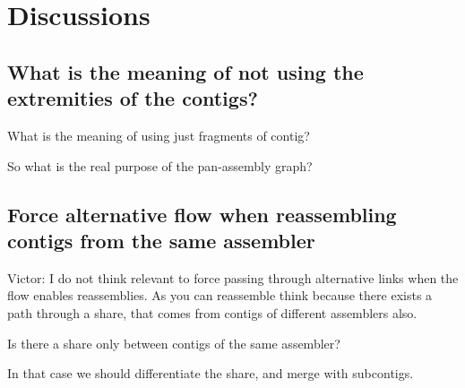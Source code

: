 \section{Discussions}

\subsection{What is the meaning of not using the extremities of the contigs?}

What is the meaning of using just fragments of contig?

So what is the real purpose of the pan-assembly graph?

\subsection{Force alternative flow when reassembling contigs from the same assembler}

Victor: I do not think relevant to force passing through alternative links when the flow enables reassemblies.
As you can reassemble think because there exists a path through a share, that comes from contigs of different assemblers also.

\begin{missingproofbox}
  Is there a share only between contigs of the same assembler?
\end{missingproofbox}

In that case we should differentiate the share, and merge with subcontigs.